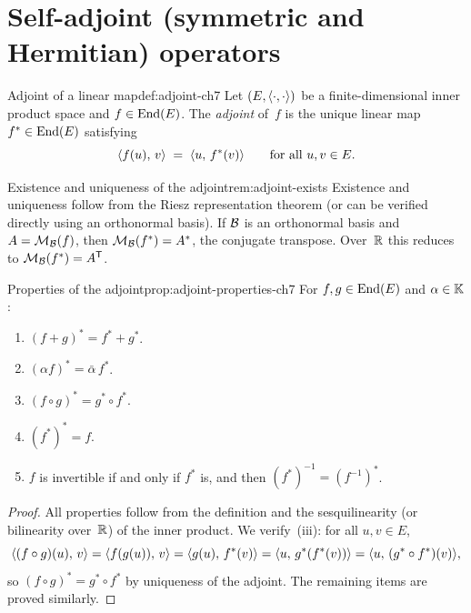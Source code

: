 \section{Self-adjoint (symmetric and Hermitian) operators}%
\label{sec:self-adjoint}

\begin{definition}{Adjoint of a linear map}{def:adjoint-ch7}
Let $(E,\langle\cdot,\cdot\rangle)$ be a finite-dimensional inner product
space and $f\in\operatorname{End}(E)$.  The \emph{adjoint} of~$f$ is the unique
linear map $f^*\in\operatorname{End}(E)$ satisfying
\[
  \langle f(u),\, v\rangle \;=\; \langle u,\, f^*(v)\rangle
  \qquad\text{for all } u,v\in E.
\]
\end{definition}

\begin{remark}{Existence and uniqueness of the adjoint}{rem:adjoint-exists}
Existence and uniqueness follow from the Riesz representation theorem
(or can be verified directly using an orthonormal basis).  If ${\mathcal{B}}$ is
an orthonormal basis and $A = \mathcal{M}_{\mathcal{B}}(f)$, then
$\mathcal{M}_{\mathcal{B}}(f^*) = {A}^{*}$, the conjugate transpose.  Over~${\mathbb{R}}$
this reduces to $\mathcal{M}_{\mathcal{B}}(f^*) = {A}^{\mathsf{T}}$.
\end{remark}

\begin{proposition}{Properties of the adjoint}{prop:adjoint-properties-ch7}
For $f,g\in\operatorname{End}(E)$ and $\alpha\in{\mathbb{K}}$:
\begin{enumerate}[label=\textup{(\roman*)}]
  \item $(f+g)^* = f^*+g^*$.
  \item $(\alpha f)^* = \bar\alpha\, f^*$.
  \item $(f\circ g)^* = g^*\circ f^*$.
  \item $(f^*)^* = f$.
  \item $f$ is invertible if and only if $f^*$ is, and then
    $(f^*)^{-1}=(f^{-1})^*$.
\end{enumerate}
\end{proposition}

\begin{proof}
All properties follow from the definition and the sesquilinearity
(or bilinearity over~${\mathbb{R}}$) of the inner product.  We verify~(iii):
for all $u,v\in E$,
\[
  \langle(f\circ g)(u),\,v\rangle
  = \langle f(g(u)),\,v\rangle
  = \langle g(u),\,f^*(v)\rangle
  = \langle u,\,g^*(f^*(v))\rangle
  = \langle u,\,(g^*\circ f^*)(v)\rangle,
\]
so $(f\circ g)^* = g^*\circ f^*$ by uniqueness of the adjoint.
The remaining items are proved similarly.
\end{proof}

